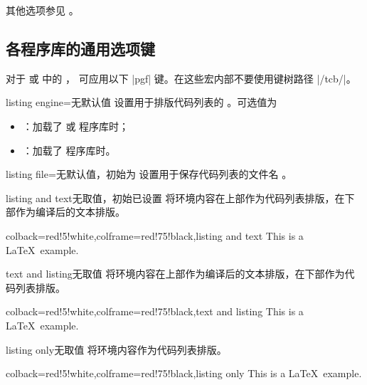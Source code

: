 其他选项参见 。



\clearpage
\subsection{各程序库的通用选项键}\label{sec:commonlistingkeys}
对于  或  中的 ，
可应用以下 |pgf| 键。在这些宏内部不要使用键树路径 |/tcb/|。

\begin{docTcbKey}{listing engine}{=}{无默认值}
  设置用于排版代码列表的 。可选值为
  \begin{itemize}
  \item{}：加载了  或  程序库时；
  \item{}：加载了  程序库时。
  \end{itemize}
\end{docTcbKey}

\begin{docTcbKey}{listing file}{=}{无默认值，初始为 }
  设置用于保存代码列表的文件名 。
\end{docTcbKey}


\begin{docTcbKey}{listing and text}{}{无取值，初始已设置}
  将环境内容在上部作为代码列表排版，在下部作为编译后的文本排版。
\begin{dispExample}
\begin{tcblisting}{colback=red!5!white,colframe=red!75!black,listing and text}
This is a \LaTeX\ example.
\end{tcblisting}
\end{dispExample}
\end{docTcbKey}


\begin{docTcbKey}{text and listing}{}{无取值}
  将环境内容在上部作为编译后的文本排版，在下部作为代码列表排版。
\begin{dispExample}
\begin{tcblisting}{colback=red!5!white,colframe=red!75!black,text and listing}
This is a \LaTeX\ example.
\end{tcblisting}
\end{dispExample}
\end{docTcbKey}


\begin{docTcbKey}{listing only}{}{无取值}
  将环境内容作为代码列表排版。
\begin{dispExample}
\begin{tcblisting}{colback=red!5!white,colframe=red!75!black,listing only}
This is a \LaTeX\ example.
\end{tcblisting}
\end{dispExample}
\end{docTcbKey}


